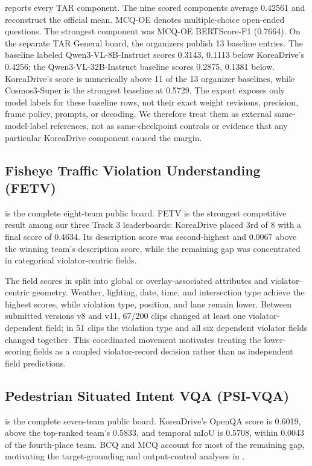 \documentclass[runningheads]{llncs}
\begin{document}
 reports every TAR component. The nine scored components average 0.42561 and reconstruct the official mean. MCQ-OE denotes multiple-choice open-ended questions. The strongest component was MCQ-OE BERTScore-F1 (0.7664). On the separate TAR General board, the organizers publish 13 baseline entries. The baseline labeled Qwen3-VL-8B-Instruct scores 0.3143, 0.1113 below KoreaDrive's 0.4256; the Qwen3-VL-32B-Instruct baseline scores 0.2875, 0.1381 below. KoreaDrive's score is numerically above 11 of the 13 organizer baselines, while Cosmos3-Super is the strongest baseline at 0.5729. The export exposes only model labels for these baseline rows, not their exact weight revisions, precision, frame policy, prompts, or decoding. We therefore treat them as external same-model-label references, not as same-checkpoint controls or evidence that any particular KoreaDrive component caused the margin.


\subsection{Fisheye Traffic Violation Understanding (FETV)}
 is the complete eight-team public board. FETV is the strongest competitive result among our three Track 3 leaderboards: KoreaDrive placed 3rd of 8 with a final score of 0.4634. Its description score was second-highest and 0.0067 above the winning team's description score, while the remaining gap was concentrated in categorical violator-centric fields.


The field scores in  split into global or overlay-associated attributes and violator-centric geometry. Weather, lighting, date, time, and intersection type achieve the highest scores, while violation type, position, and lane remain lower. Between submitted versions v8 and v11, 67/200 clips changed at least one violator-dependent field; in 51 clips the violation type and all six dependent violator fields changed together. This coordinated movement motivates treating the lower-scoring fields as a coupled violator-record decision rather than as independent field predictions.


\subsection{Pedestrian Situated Intent VQA (PSI-VQA)}
 is the complete seven-team public board. KoreaDrive's OpenQA score is 0.6019, above the top-ranked team's 0.5833, and temporal mIoU is 0.5708, within 0.0043 of the fourth-place team. BCQ and MCQ account for most of the remaining gap, motivating the target-grounding and output-control analyses in .
\end{document}
